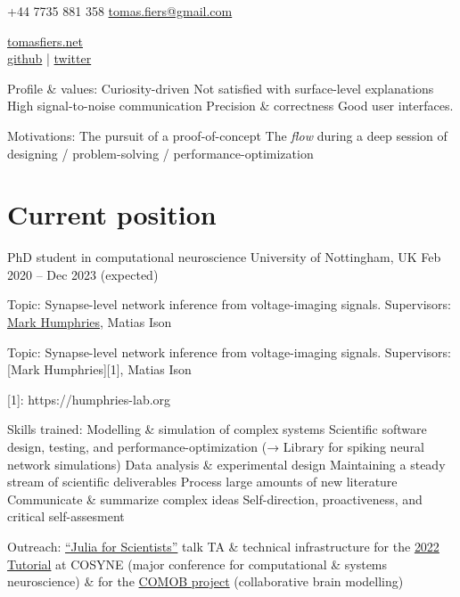 \documentclass[a4]{article}
\author{Tomas Fiers}
\makeatletter
\def\email{tomas.fiers@gmail.com}
\def\phoneUK{+44 7735 881 358}
\def\phone{\phoneUK}
\def\website{tomasfiers.net}
\def\github{tfiers}
\def\twitter{TomasFiers}
\makeatother
\begin{document}
{\large\phone}
\href{mailto:\email}{\email}

\makeatletter  %
{\huge\@author}
\makeatother  %

\href{https://\website}{\large\website} \\
\href{https://github.com/\github}{github} |
\href{https://twitter.com/\twitter}{twitter}


Profile \& values:
Curiosity-driven
Not satisfied with surface-level explanations
High signal-to-noise communication
Precision \& correctness
Good user interfaces.

Motivations:
The pursuit of a proof-of-concept
The \emph{flow} during a deep session of designing / problem-solving / performance-optimization



\section{Current position}

PhD student in computational neuroscience
University of Nottingham, UK
Feb 2020  –  Dec  2023  (expected)

Topic:  Synapse-level network inference from voltage-imaging signals.
Supervisors:  \href{https://humphries-lab.org}{Mark Humphries}, Matias Ison

Topic:  Synapse-level network inference from voltage-imaging signals.
Supervisors:  [Mark Humphries][1], Matias Ison

[1]: https://humphries-lab.org

Skills trained:
Modelling \& simulation of complex systems
Scientific software design, testing, and performance-optimization (→ Library for spiking neural network simulations)
Data analysis \& experimental design
Maintaining a steady stream of scientific deliverables
Process large amounts of new literature
Communicate \& summarize complex ideas
Self-direction, proactiveness, and critical self-assesment

Outreach:
\href{https://tomasfiers.net/posts/julia-for-scientists}{``Julia for Scientists''} talk
TA \& technical infrastructure for the \href{https://github.com/neural-reckoning/cosyne-tutorial-2022}{2022 Tutorial} at COSYNE (major conference for computational \& systems neuroscience) \& for the \href{https://comob-project.github.io}{COMOB project} (collaborative brain modelling)
\end{document}
